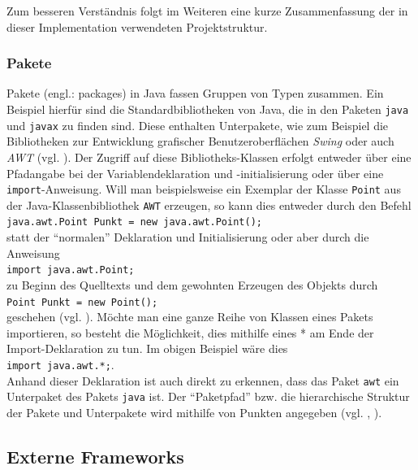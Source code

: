 \documentclass[paper=a4, DIV=calc, BCOR=12mm, twoside=on, onecolumn=on, open = right, titlepage =on, parskip =half-, headsepline = on, footsepline = off, chapterprefix = off, appendixprefix = on, fontsize = 12pt, numbers = noenddot, abstract = on]{scrbook}
\begin{document}
Zum besseren Verständnis folgt im Weiteren eine kurze Zusammenfassung der in dieser Implementation verwendeten Projektstruktur.


\subsubsection*{Pakete}

Pakete (engl.: packages) in Java fassen Gruppen von Typen zusammen. Ein Beispiel hierfür sind die Standardbibliotheken von Java, die in den Paketen \texttt{java} und \texttt{javax} zu finden sind. Diese enthalten Unterpakete, wie zum Beispiel die Bibliotheken zur Entwicklung grafischer Benutzeroberflächen \emph{Swing} oder auch \emph{AWT} (vgl. \cite[S.265]{ullenboom:12}).
Der Zugriff auf diese Bibliotheks-Klassen erfolgt entweder über eine Pfadangabe bei der Variablendeklaration und -initialisierung oder über eine \texttt{import}-Anweisung. Will man beispielsweise ein Exemplar der Klasse \texttt{Point} aus der Java-Klassenbibliothek \texttt{AWT} erzeugen, so kann dies entweder durch den Befehl\\
\hspace*{2em} \texttt{java.awt.Point Punkt = new java.awt.Point();}\\
statt der "`normalen"' Deklaration und Initialisierung oder aber durch die Anweisung\\ \hspace*{2em} \texttt{import java.awt.Point;}\\
zu Beginn des Quelltexts und dem gewohnten Erzeugen des Objekts durch\\
\hspace*{2em} \texttt{Point Punkt = new Point();}\\
geschehen (vgl. \cite[S.266]{ullenboom:12}).
Möchte man eine ganze Reihe von Klassen eines Pakets importieren, so besteht die Möglichkeit, dies mithilfe eines * am Ende der Import-Deklaration zu tun. Im obigen Beispiel wäre dies\\
\hspace*{2em} \texttt{import java.awt.*;}.\\
Anhand dieser Deklaration ist auch direkt zu erkennen, dass das Paket \texttt{awt} ein Unterpaket des Pakets \texttt{java} ist. Der "`Paketpfad"' bzw. die hierarchische Struktur der Pakete und Unterpakete wird mithilfe von Punkten angegeben (vgl. \cite[S.265ff.]{ullenboom:12}, \cite[S.84ff.]{abts:15}).


\subsection{Externe Frameworks}
\end{document}

